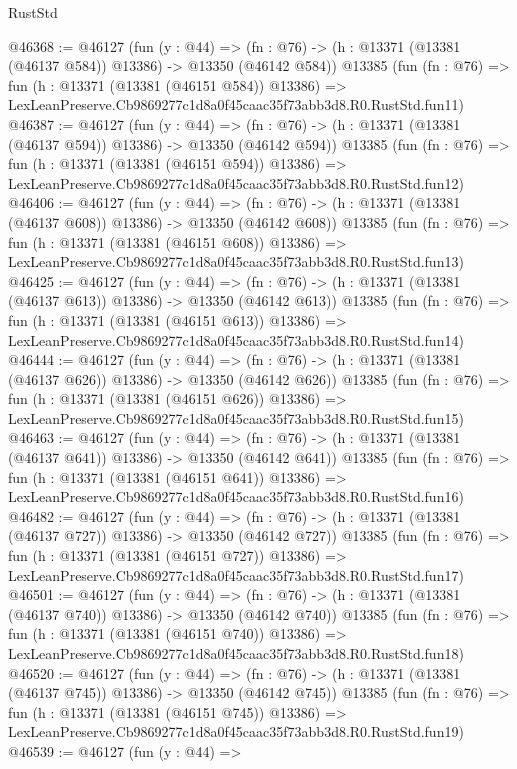 \begin{lexlean}{RustStd}
\begin{coremodule}
@46368 := @46127
    (fun (y : @44) =>
    (fn : @76) -> (h : @13371 (@13381 (@46137 @584)) @13386) -> @13350 (@46142 @584))
    @13385
    (fun (fn : @76) =>
    fun (h : @13371 (@13381 (@46151 @584)) @13386) =>
    LexLeanPreserve.Cb9869277c1d8a0f45caac35f73abb3d8.R0.RustStd.fun11)
@46387 := @46127
    (fun (y : @44) =>
    (fn : @76) -> (h : @13371 (@13381 (@46137 @594)) @13386) -> @13350 (@46142 @594))
    @13385
    (fun (fn : @76) =>
    fun (h : @13371 (@13381 (@46151 @594)) @13386) =>
    LexLeanPreserve.Cb9869277c1d8a0f45caac35f73abb3d8.R0.RustStd.fun12)
@46406 := @46127
    (fun (y : @44) =>
    (fn : @76) -> (h : @13371 (@13381 (@46137 @608)) @13386) -> @13350 (@46142 @608))
    @13385
    (fun (fn : @76) =>
    fun (h : @13371 (@13381 (@46151 @608)) @13386) =>
    LexLeanPreserve.Cb9869277c1d8a0f45caac35f73abb3d8.R0.RustStd.fun13)
@46425 := @46127
    (fun (y : @44) =>
    (fn : @76) -> (h : @13371 (@13381 (@46137 @613)) @13386) -> @13350 (@46142 @613))
    @13385
    (fun (fn : @76) =>
    fun (h : @13371 (@13381 (@46151 @613)) @13386) =>
    LexLeanPreserve.Cb9869277c1d8a0f45caac35f73abb3d8.R0.RustStd.fun14)
@46444 := @46127
    (fun (y : @44) =>
    (fn : @76) -> (h : @13371 (@13381 (@46137 @626)) @13386) -> @13350 (@46142 @626))
    @13385
    (fun (fn : @76) =>
    fun (h : @13371 (@13381 (@46151 @626)) @13386) =>
    LexLeanPreserve.Cb9869277c1d8a0f45caac35f73abb3d8.R0.RustStd.fun15)
@46463 := @46127
    (fun (y : @44) =>
    (fn : @76) -> (h : @13371 (@13381 (@46137 @641)) @13386) -> @13350 (@46142 @641))
    @13385
    (fun (fn : @76) =>
    fun (h : @13371 (@13381 (@46151 @641)) @13386) =>
    LexLeanPreserve.Cb9869277c1d8a0f45caac35f73abb3d8.R0.RustStd.fun16)
@46482 := @46127
    (fun (y : @44) =>
    (fn : @76) -> (h : @13371 (@13381 (@46137 @727)) @13386) -> @13350 (@46142 @727))
    @13385
    (fun (fn : @76) =>
    fun (h : @13371 (@13381 (@46151 @727)) @13386) =>
    LexLeanPreserve.Cb9869277c1d8a0f45caac35f73abb3d8.R0.RustStd.fun17)
@46501 := @46127
    (fun (y : @44) =>
    (fn : @76) -> (h : @13371 (@13381 (@46137 @740)) @13386) -> @13350 (@46142 @740))
    @13385
    (fun (fn : @76) =>
    fun (h : @13371 (@13381 (@46151 @740)) @13386) =>
    LexLeanPreserve.Cb9869277c1d8a0f45caac35f73abb3d8.R0.RustStd.fun18)
@46520 := @46127
    (fun (y : @44) =>
    (fn : @76) -> (h : @13371 (@13381 (@46137 @745)) @13386) -> @13350 (@46142 @745))
    @13385
    (fun (fn : @76) =>
    fun (h : @13371 (@13381 (@46151 @745)) @13386) =>
    LexLeanPreserve.Cb9869277c1d8a0f45caac35f73abb3d8.R0.RustStd.fun19)
@46539 := @46127
    (fun (y : @44) =>

\end{coremodule}
\end{lexlean}
